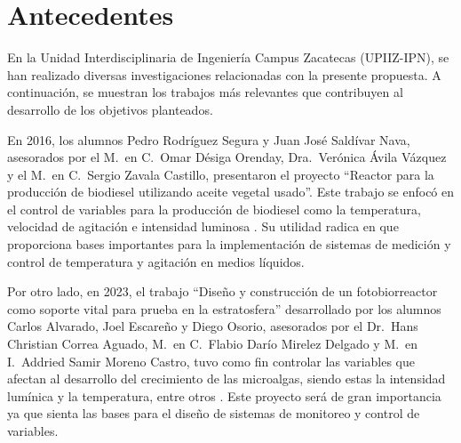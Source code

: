 \chapter{Antecedentes}\label{cap3}

En la Unidad Interdisciplinaria de Ingeniería Campus Zacatecas (UPIIZ-IPN), se
han realizado diversas investigaciones relacionadas con la presente propuesta. A
continuación, se muestran los trabajos más relevantes que contribuyen al desarrollo
de los objetivos planteados.

En 2016, los alumnos Pedro Rodríguez Segura y Juan José Saldívar Nava,
asesorados por el M.\ en C.\ Omar Désiga Orenday, Dra.\ Verónica Ávila Vázquez y
el M.\ en C.\ Sergio Zavala Castillo, presentaron el proyecto ``Reactor para la
producción de biodiesel utilizando aceite vegetal usado''. Este trabajo se enfocó en
el control de variables para la producción de biodiesel como la temperatura,
velocidad de agitación e intensidad luminosa \cite{Rodriguez2016}. Su utilidad radica en que
proporciona bases importantes para la implementación de sistemas de medición y
control de temperatura y agitación en medios líquidos.

Por otro lado, en 2023, el trabajo ``Diseño y construcción de un fotobiorreactor como
soporte vital para prueba en la estratosfera'' desarrollado por los alumnos Carlos
Alvarado, Joel Escareño y Diego Osorio, asesorados por el Dr.\ Hans Christian
Correa Aguado, M.\ en C.\ Flabio Darío Mirelez Delgado y M.\ en I.\ Addried Samir
Moreno Castro, tuvo como fin controlar las variables que afectan al desarrollo del
crecimiento de las microalgas, siendo estas la intensidad lumínica y la temperatura,
entre otros \cite{Alvarado2023}. Este proyecto será de gran importancia ya que sienta las bases para
el diseño de sistemas de monitoreo y control de variables.
